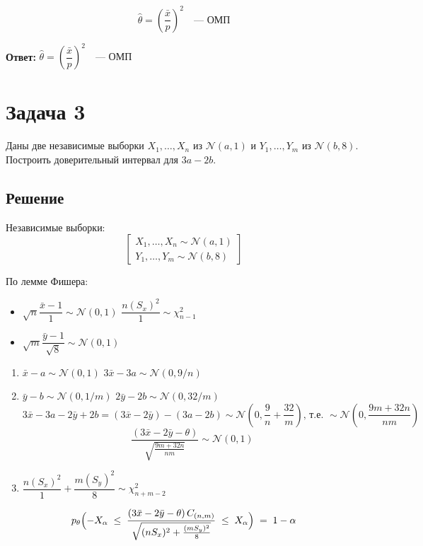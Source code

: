 \documentclass[areasetadvanced]{scrartcl}
\begin{document}
\[
\hat{\theta} = \left( \frac{\bar{x}}{p} \right)^2 \quad \text{— ОМП}
\]

\textbf{Ответ:} \( \hat{\theta} = \left( \dfrac{\bar{x}}{p} \right)^2 \quad \text{— ОМП} \)
\newpage
\section{Задача 3}
Даны две независимые выборки \( X_1, \ldots, X_n \) из \( \mathcal{N}(a, 1) \) и \( Y_1, \ldots, Y_m \) из \( \mathcal{N}(b, 8) \). Построить доверительный интервал для \( 3a - 2b \).

\subsection{Решение}
Независимые выборки:
\[
\left[
\begin{array}{l}
X_1, \dots, X_n \sim \mathcal{N}(a, 1) \\
Y_1, \dots, Y_m \sim \mathcal{N}(b, 8)
\end{array}
\right]
\]

По лемме Фишера:
\begin{itemize}
	\item $\sqrt{n}\dfrac{\bar{x}-1}{1} \sim \mathcal{N}(0,1)$
	\subitem $\dfrac{n(S_x)^2}{1} \sim \chi^2_{n-1}$
	\item $\sqrt{m}\dfrac{\bar{y}-1}{\sqrt{8}} \sim \mathcal{N}(0,1)$
\end{itemize}

\begin{enumerate}
	\item $\bar{x}-a \sim \mathcal{N}(0,1)$
	\subitem $3\bar{x}-3a \sim \mathcal{N}(0, 9/n)$
	\item $\bar{y}-b \sim \mathcal{N}(0,1/m)$
	\subitem $2\bar{y}-2b \sim \mathcal{N}(0, 32/m)$
	\subitem \[
	3\bar{x}-3a - 2\bar{y}+2b = (3\bar{x}-2\bar{y}) - (3a-2b) \sim \mathcal{N}\left(0, \frac{9}{n} + \frac{32}{m}\right) \text{, т.е. } \sim \mathcal{N}\left(0, \frac{9m+32n}{nm}\right)
	\]
	\subitem \[ \frac{(3\bar{x} - 2\bar{y} - \theta)}{\sqrt{\frac{9m+32n}{nm}}} \sim \mathcal{N}(0,1) \]
	\item $\dfrac{n(S_x)^2}{1} + \dfrac{m(S_y)^2}{8} \sim \chi^2_{n+m-2}$
\end{enumerate}
$$ p_\theta\Bigl(
 -X_\alpha 
 \;\le\; 
 \frac{(3\bar{x} - 2\bar{y} - \theta)\,C_{(n,m)}}{\sqrt{(nS_x)^2 + \frac{(mS_y)^2}{8}}}
 \;\le\;
 X_\alpha
\Bigr)
\;=\;
1-\alpha $$
\end{document}
